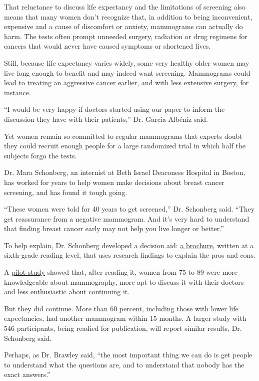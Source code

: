 That reluctance to discuss life expectancy and the limitations of
screening also means that many women don't recognize that, in addition
to being inconvenient, expensive and a cause of discomfort or anxiety,
mammograms can actually do harm. The tests often prompt unneeded
surgery, radiation or drug regimens for cancers that would never have
caused symptoms or shortened lives.

Still, because life expectancy varies widely, some very healthy older
women may live long enough to benefit and may indeed want screening.
Mammograms could lead to treating an aggressive cancer earlier, and with
less extensive surgery, for instance.

``I would be very happy if doctors started using our paper to inform the
discussion they have with their patients,'' Dr. Garcia-Albéniz said.

Yet women remain so committed to regular mammograms that experts doubt
they could recruit enough people for a large randomized trial in which
half the subjects forgo the tests.

Dr. Mara Schonberg, an internist at Beth Israel Deaconess Hospital in
Boston, has worked for years to help women make decisions about breast
cancer screening, and has found it tough going.

``These women were told for 40 years to get screened,'' Dr. Schonberg
said. ``They get reassurance from a negative mammogram. And it's very
hard to understand that finding breast cancer early may not help you
live longer or better.''

To help explain, Dr. Schonberg developed a decision aid:
\href{https://eprognosis.ucsf.edu/decision_aids.php}{a brochure},
written at a sixth-grade reading level, that uses research findings to
explain the pros and cons.

A
\href{https://jamanetwork.com/journals/jamainternalmedicine/fullarticle/1792914}{pilot
study} showed that, after reading it, women from 75 to 89 were more
knowledgeable about mammography, more apt to discuss it with their
doctors and less enthusiastic about continuing it.

But they did continue. More than 60 percent, including those with lower
life expectancies, had another mammogram within 15 months. A larger
study with 546 participants, being readied for publication, will report
similar results, Dr. Schonberg said.

Perhaps, as Dr. Brawley said, ``the most important thing we can do is
get people to understand what the questions are, and to understand that
nobody has the exact answers.''

